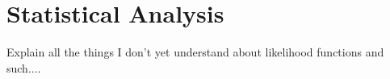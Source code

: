 \chapter{Statistical Analysis}
Explain all the things I don't yet understand about likelihood functions and such....